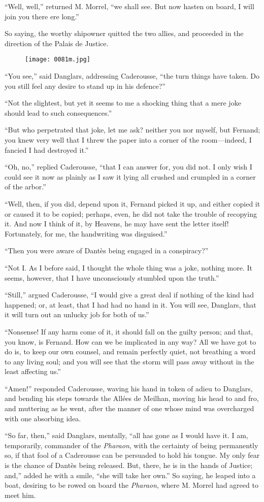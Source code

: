 “Well, well,” returned M. Morrel, “we shall see. But now hasten on
board, I will join you there ere long.”

So saying, the worthy shipowner quitted the two allies, and proceeded
in the direction of the Palais de Justice.

\begin{figure}[h]
\texttt{[image: 0081m.jpg]}
\end{figure}

“You see,” said Danglars, addressing Caderousse, “the turn things have
taken. Do you still feel any desire to stand up in his defence?”

“Not the slightest, but yet it seems to me a shocking thing that a mere
joke should lead to such consequences.”

“But who perpetrated that joke, let me ask? neither you nor myself, but
Fernand; you knew very well that I threw the paper into a corner of the
room—indeed, I fancied I had destroyed it.”

“Oh, no,” replied Caderousse, “that I can answer for, you did not. I
only wish I could see it now as plainly as I saw it lying all crushed
and crumpled in a corner of the arbor.”

“Well, then, if you did, depend upon it, Fernand picked it up, and
either copied it or caused it to be copied; perhaps, even, he did not
take the trouble of recopying it. And now I think of it, by Heavens, he
may have sent the letter itself! Fortunately, for me, the handwriting
was disguised.”

“Then you were aware of Dantès being engaged in a conspiracy?”

“Not I. As I before said, I thought the whole thing was a joke, nothing
more. It seems, however, that I have unconsciously stumbled upon the
truth.”

“Still,” argued Caderousse, “I would give a great deal if nothing of
the kind had happened; or, at least, that I had had no hand in it. You
will see, Danglars, that it will turn out an unlucky job for both of
us.”

“Nonsense! If any harm come of it, it should fall on the guilty person;
and that, you know, is Fernand. How can we be implicated in any way?
All we have got to do is, to keep our own counsel, and remain perfectly
quiet, not breathing a word to any living soul; and you will see that
the storm will pass away without in the least affecting us.”

“Amen!” responded Caderousse, waving his hand in token of adieu to
Danglars, and bending his steps towards the Allées de Meilhan, moving
his head to and fro, and muttering as he went, after the manner of one
whose mind was overcharged with one absorbing idea.

“So far, then,” said Danglars, mentally, “all has gone as I would have
it. I am, temporarily, commander of the \textit{Pharaon}, with the certainty
of being permanently so, if that fool of a Caderousse can be persuaded
to hold his tongue. My only fear is the chance of Dantès being
released. But, there, he is in the hands of Justice; and,” added he
with a smile, “she will take her own.” So saying, he leaped into a
boat, desiring to be rowed on board the \textit{Pharaon}, where M. Morrel had
agreed to meet him.
